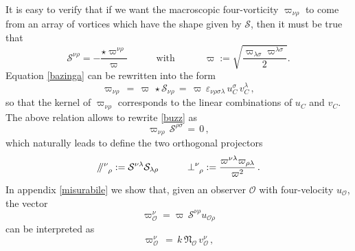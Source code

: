 \documentclass[usenatbib%
]{mnras}
\newcommand{\spc}{\quad \quad \quad}
\newcommand{\paral}{\mathbin{ \, \!/\mkern-5mu/\!} \,}
\begin{document}
It is easy to verify that if we want the macroscopic four-vorticity $\varpi_{\nu \rho}$ to come from an array of vortices which have the shape given by $\mathcal{S}$, then it must be true that
\begin{equation}\label{bazinga}
\mathcal{S}^{\nu \rho} = - \dfrac{{\star}\varpi^{\nu \rho}}{\varpi}  \spc \text{with}  \spc  \varpi := \sqrt{\dfrac{\varpi_{\lambda \sigma} \varpi^{\lambda \sigma}}{2}}.
\end{equation}
Equation \eqref{bazinga} can be rewritten into the form
\begin{equation}\label{pluto}
\varpi_{\nu \rho} \, = \, \varpi \, {\star}\mathcal{S}_{\nu \rho} 
\, =  \, \varpi \,\varepsilon_{\nu \rho \sigma \lambda} \, u_C^\sigma \, v_C^\lambda \, ,
\end{equation}
so that the kernel of $\varpi_{\nu \rho}$ corresponds to the linear combinations of $u_C$ and $v_C$.
The above relation allows to rewrite  \eqref{buzz} as
\begin{equation}\label{gandalf}
\varpi_{\nu \rho} \, \mathcal{S}^{\rho \sigma} \, = \, 0 \, ,
\end{equation}
which naturally leads to define the two orthogonal projectors
\begin{equation}\label{frodo}
\paral\indices{^\nu _\rho}:= \mathcal{S}^{\nu \lambda} \mathcal{S}_{\lambda \rho}  \spc  {\perp}\indices{^\nu _\rho} := \dfrac{\varpi^{\nu \lambda}\varpi_{\rho \lambda}}{\varpi^2} \, .
\end{equation}
%
%
In appendix \ref{misurabile} we show that, given an observer $\mathcal{O}$ with four-velocity $u_\mathcal{O}$, the vector
\begin{equation}\label{lapseudobig}
\varpi_{\mathcal{O}}^\nu =  \varpi \, \mathcal{S}^{\nu \rho} u_{\mathcal{O} \rho}
\end{equation}
can be interpreted as 
\begin{equation}\label{ilfulcrodeldiscorso}
\varpi_{\mathcal{O}}^\nu \, = \, k \, \mathfrak{N}_{\mathcal{O}} \, v_{\mathcal{O}}^\nu \, ,
\end{equation}
\end{document}
